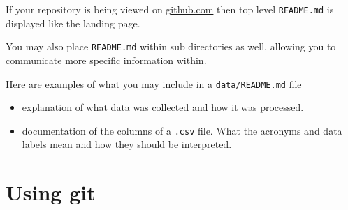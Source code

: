 \documentclass[
  letterpaper,
  DIV=11,
  numbers=noendperiod]{scrreprt}
\begin{document}
If your repository is being viewed on \url{github.com} then top level
\texttt{README.md} is displayed like the landing page.

\begin{tcolorbox}[enhanced jigsaw, left=2mm, colframe=quarto-callout-tip-color-frame, leftrule=.75mm, opacitybacktitle=0.6, toptitle=1mm, title=\textcolor{quarto-callout-tip-color}{\faLightbulb}\hspace{0.5em}{Tip}, opacityback=0, coltitle=black, colbacktitle=quarto-callout-tip-color!10!white, breakable, colback=white, titlerule=0mm, bottomrule=.15mm, arc=.35mm, bottomtitle=1mm, rightrule=.15mm, toprule=.15mm]

You may also place \texttt{README.md} within sub directories as well,
allowing you to communicate more specific information within.

Here are examples of what you may include in a \texttt{data/README.md}
file

\begin{itemize}
\item
  explanation of what data was collected and how it was processed.
\item
  documentation of the columns of a \texttt{.csv} file. What the
  acronyms and data labels mean and how they should be interpreted.
\end{itemize}

\end{tcolorbox}

\hypertarget{sec-git}{%
\section{Using git}\label{sec-git}}
\end{document}

